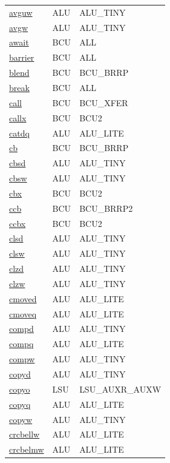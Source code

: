 \begin{small}
\begin{longtable}[l]{l l l}
\hyperlink{lvx.avguw}{avguw} & ALU & ALU\_TINY \\ 
\hyperlink{lvx.avgw}{avgw} & ALU & ALU\_TINY \\ 
\hyperlink{lvx.await}{await} & BCU & ALL \\ 
\hyperlink{lvx.barrier}{barrier} & BCU & ALL \\ 
\hyperlink{lvx.blend}{blend} & BCU & BCU\_BRRP \\ 
\hyperlink{lvx.break}{break} & BCU & ALL \\ 
\hyperlink{lvx.call}{call} & BCU & BCU\_XFER \\ 
\hyperlink{lvx.callx}{callx} & BCU & BCU2 \\ 
\hyperlink{lvx.catdq}{catdq} & ALU & ALU\_LITE \\ 
\hyperlink{lvx.cb}{cb} & BCU & BCU\_BRRP \\ 
\hyperlink{lvx.cbsd}{cbsd} & ALU & ALU\_TINY \\ 
\hyperlink{lvx.cbsw}{cbsw} & ALU & ALU\_TINY \\ 
\hyperlink{lvx.cbx}{cbx} & BCU & BCU2 \\ 
\hyperlink{lvx.ccb}{ccb} & BCU & BCU\_BRRP2 \\ 
\hyperlink{lvx.ccbx}{ccbx} & BCU & BCU2 \\ 
\hyperlink{lvx.clsd}{clsd} & ALU & ALU\_TINY \\ 
\hyperlink{lvx.clsw}{clsw} & ALU & ALU\_TINY \\ 
\hyperlink{lvx.clzd}{clzd} & ALU & ALU\_TINY \\ 
\hyperlink{lvx.clzw}{clzw} & ALU & ALU\_TINY \\ 
\hyperlink{lvx.cmoved}{cmoved} & ALU & ALU\_LITE \\ 
\hyperlink{lvx.cmoveq}{cmoveq} & ALU & ALU\_LITE \\ 
\hyperlink{lvx.compd}{compd} & ALU & ALU\_TINY \\ 
\hyperlink{lvx.compq}{compq} & ALU & ALU\_LITE \\ 
\hyperlink{lvx.compw}{compw} & ALU & ALU\_TINY \\ 
\hyperlink{lvx.copyd}{copyd} & ALU & ALU\_TINY \\ 
\hyperlink{lvx.copyo}{copyo} & LSU & LSU\_AUXR\_AUXW \\ 
\hyperlink{lvx.copyq}{copyq} & ALU & ALU\_LITE \\ 
\hyperlink{lvx.copyw}{copyw} & ALU & ALU\_TINY \\ 
\hyperlink{lvx.crcbellw}{crcbellw} & ALU & ALU\_LITE \\ 
\hyperlink{lvx.crcbelmw}{crcbelmw} & ALU & ALU\_LITE \\ 

\end{longtable}
\end{small}
